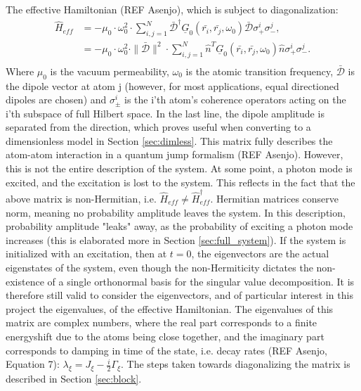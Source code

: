 \documentclass{article}
\begin{document}
The effective Hamiltonian (REF Asenjo), which is subject to diagonalization:
\begin{equation}\label{eq:Heff}
    \begin{split}
        \hat{H}_{eff} &= - \mu_0 \cdot \omega_0^2 \cdot \sum_{i,j = 1}^N \bar{\mathscr{D}}^\dagger \underline{G}_0(\bar{r_i}, \bar{r_j}, \omega_0) \bar{\mathscr{D}} \sigma_+^i \sigma_-^j, \\
        &=- \mu_0 \cdot \omega_0^2 \cdot \|\bar{\mathscr{D}}\|^2 \cdot \sum_{i,j = 1}^N \hat{n}^T \underline{G}_0(\bar{r_i}, \bar{r_j}, \omega_0) \hat{n} \sigma_+^i \sigma_-^j. \\
    \end{split}
\end{equation}
Where $\mu_0$ is the vacuum permeability, $\omega_0$ is the atomic transition frequency, $\bar{\mathscr{D}}$ is the dipole vector at atom j (however, for most applications, equal directioned dipoles are chosen) and $\sigma_\pm^i$ is the i'th atom's coherence operators acting on the i'th subspace of full Hilbert space. In the last line, the dipole amplitude is separated from the direction, which proves useful when converting to a dimensionless model in Section \ref{sec:dimless}. This matrix fully describes the atom-atom interaction in a quantum jump formalism (REF Asenjo). However, this is not the entire description of the system. At some point, a photon mode is excited, and the excitation is lost to the system. This reflects in the fact that the above matrix is non-Hermitian, i.e. $\hat{H}_{eff} \neq \hat{H}_{eff}^\dagger$. Hermitian matrices conserve norm, meaning no probability amplitude leaves the system. In this description, probability amplitude "leaks" away, as the probability of exciting a photon mode increases (this is elaborated more in Section \ref{sec:full_system}). If the system is initialized with an excitation, then at $t=0$, the eigenvectors are the actual eigenstates of the system, even though the non-Hermiticity dictates the non-existence of a single orthonormal basis for the singular value decomposition. It is therefore still valid to consider the eigenvectors, and of particular interest in this project the eigenvalues, of the effective Hamiltonian. The eigenvalues of this matrix are complex numbers, where the real part corresponds to a finite energyshift due to the atoms being close together, and the imaginary part corresponds to damping in time of the state, i.e. decay rates (REF Asenjo, Equation 7): $\lambda_\xi = J_\xi - \frac{i}{2} \Gamma_\xi$. The steps taken towards diagonalizing the matrix is described in Section \ref{sec:block}. 
\end{document}
